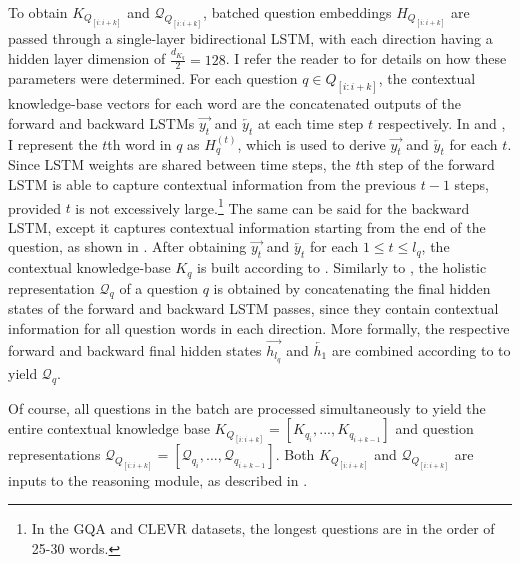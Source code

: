 To obtain \(K_{Q_{[i:i+k]}}\) and \(\mathcal{Q}_{Q_{[i:i+k]}}\), batched question embeddings \(H_{Q_{[i:i+k]}}\) are passed through a single-layer bidirectional LSTM, with each direction having a hidden layer dimension of \(\frac{d_{K_q}}{2} = 128\). I refer the reader to \sectionautorefname{ \ref{sec:hyperparameter_optimisation}} for details on how these parameters were determined. For each question \(q \in Q_{[i:i+k]}\), the contextual knowledge-base vectors for each word are the concatenated outputs of the forward and backward LSTMs \(\overrightarrow{y_t}\) and \(\overleftarrow{y_t}\) at each time step \(t\) respectively. In \equationautorefname{ \ref{equation:question_module_forward_y_t}} and \equationautorefname{ \ref{equation:question_module_backward_y_t}}, I represent the \(t\)th word in \(q\) as \(H_q^{(t)}\), which is used to derive \(\overrightarrow{y_t}\) and \(\overleftarrow{y_t}\) for each \(t\). Since LSTM weights are shared between time steps, the \(t\)th step of the forward LSTM is able to capture contextual information from the previous \(t-1\) steps, provided \(t\) is not excessively large.\footnote{In the GQA and CLEVR datasets, the longest questions are in the order of 25-30 words.} The same can be said for the backward LSTM, except it captures contextual information starting from the end of the question, as shown in \figureautorefname{ \ref{fig:question_module_bilstm}}. After obtaining \(\overrightarrow{y_t}\) and \(\overleftarrow{y_t}\) for each \(1 \leq t \leq l_q\), the contextual knowledge-base \(K_q\) is built according to \equationautorefname{ \ref{equation:question_module_K_q}}. Similarly to \cite{hudson2018compositional}, the holistic representation \(\mathcal{Q}_q\) of a question \(q\) is obtained by concatenating the final hidden states of the forward and backward LSTM passes, since they contain contextual information for all question words in each direction. More formally, the respective forward and backward final hidden states \(\overrightarrow{h_{l_q}}\) and \(\overleftarrow{h_{1}}\) are combined according to \equationautorefname{ \ref{equation:question_module_Q_q}} to yield \(\mathcal{Q}_q\).

 Of course, all questions in the batch are processed simultaneously to yield the entire contextual knowledge base \(K_{Q_{[i:i+k]}} = [K_{q_i}, ..., K_{q_{i+k-1}}]\) and question representations \(\mathcal{Q}_{Q_{[i:i+k]}} = [\mathcal{Q}_{q_i}, ..., \mathcal{Q}_{q_{i+k-1}}]\). Both \(K_{Q_{[i:i+k]}}\) and \(\mathcal{Q}_{Q_{[i:i+k]}}\) are inputs to the reasoning module, as described in \sectionautorefname{ \ref{section:reasoning_module}}.

